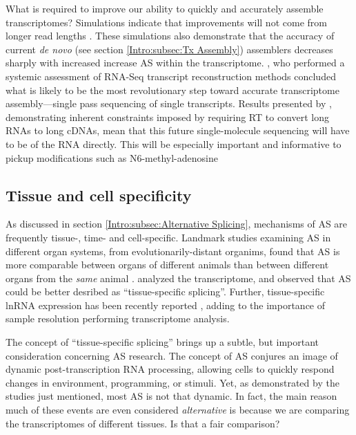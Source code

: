     What is required to improve our ability to quickly and accurately assemble transcriptomes? Simulations indicate that improvements will not come from longer read lengths \citep{Chang2014c}. These simulations also demonstrate that the accuracy of current \textit{de novo} (see section \ref{Intro:subsec:Tx Assembly}) assemblers decreases sharply with increased increase AS within the transcriptome. \citet{Engstrom2013}, who performed a systemic assessment of RNA-Seq transcript reconstruction methods concluded what is likely to be the most revolutionary step toward accurate transcriptome assembly---single pass sequencing of single transcripts. Results presented by \citep{Sharon2013}, demonstrating inherent constraints imposed by requiring RT to convert long RNAs to long cDNAs, mean that this future single-molecule sequencing will have to be of the RNA directly. This will be especially important and informative to pickup modifications such as N6-methyl-adenosine \citep{Pan2013}

  \subsection{Tissue and cell specificity}
    \label{Disc:subsec:Tissue-specific Tx expression}

    As discussed in section \ref{Intro:subsec:Alternative Splicing}, mechanisms of AS are frequently tissue-, time- and cell-specific. Landmark studies examining AS in different organ systems, from evolutionarily-distant organims, found that AS is more comparable between organs of different animals than between different organs from the \textit{same} animal \citep{Barbosa-Morais2012,Merkin2012}. \citet{Brown2014} analyzed the \flies{} transcriptome, and observed that AS could be better desribed as ``tissue-specific splicing''. Further, tissue-specific lnRNA expression has been recently reported \citep{Washietl2014}, adding to the importance of sample resolution performing transcriptome analysis.

    The concept of ``tissue-specific splicing'' brings up a subtle, but important consideration concerning AS research. The concept of AS conjures an image of dynamic post-transcription RNA processing, allowing cells to quickly respond changes in environment, programming, or stimuli. Yet, as demonstrated by the studies just mentioned, most AS is not that dynamic. In fact, the main reason much of these events are even considered \textit{alternative} is because we are comparing the transcriptomes of different tissues. Is that a fair comparison?

